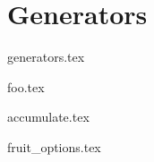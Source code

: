 \documentclass{exam}
\begin{document}
\section{Generators}
\begingroup
{generators.tex}
\endgroup
\begin{questions}
    \setcounter{question}{7}
    {foo.tex}

    {accumulate.tex}

    {fruit_options.tex}
\end{questions}
\end{document}
